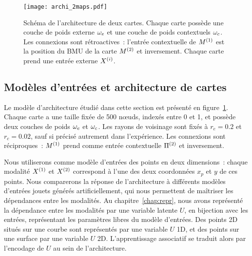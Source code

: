 \documentclass[../main]{subfiles}
\begin{document}
\begin{figure}
	\centering\texttt{[image: archi\_2maps.pdf]}
	\caption{Schéma de l'architecture de deux cartes. Chaque carte possède une couche de poids externe $\omega_e$ et une couche de poids contextuels $\omega_c$. Les connexions sont rétroactives~: l'entrée contextuelle de $M^{({1})}$ est la position du BMU de la carte $M^{({2})}$ et inversement. 
	Chaque carte prend une entrée externe $X^{({i})}$.\label{fig:archis}}
\end{figure}

\subsection{Modèles d'entrées et architecture de cartes}

Le modèle d'architecture étudié dans cette section est présenté en figure~\ref{fig:archis}.
Chaque carte a une taille fixée de 500 n\oe{}uds, indexés entre 0 et 1, et possède deux couches de poids $\omega_e$ et $\omega_c$. Les rayons de voisinage sont fixés à $r_e = 0.2$ et $r_c = 0.02$, sauf si précisé autrement dans l'expérience. Les connexions sont réciproques~: $M^{({1})}$ prend comme entrée contextuelle $\Pi^{({2})}$ et inversement.

Nous utiliserons comme modèle d'entrées des points en deux dimensions~: chaque modalité $X^{({1})}$ et $X^{({2})}$ correspond à l'une des deux coordonnées $x_p$ et $y$ de ces points. Nous comparerons la réponse de l'architecture à différents modèles d'entrées jouets générés artificiellement, qui nous permettent de maîtriser les dépendances entre les modalités.
Au chapitre~\ref{chap:repr}, nous avons représenté la dépendance entre les modalités par une variable latente $U$, en bijection avec les entrées, représentant les paramètres libres du modèle d'entrées. 
Des points 2D situés sur une courbe sont représentés par une variable $U$ 1D, et des points sur une surface par une variable $U$ 2D. L'apprentissage associatif se traduit alors par l'encodage de $U$ au sein de l'architecture.
\end{document}
